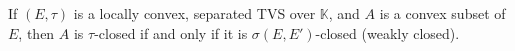 If $(E, \tau)$ is a locally convex, separated TVS over $\mathbb{K}$, and $A$ is a convex subset of $E$, then $A$ is $\tau$-closed if and only if it is $\sigma(E, E')$-closed (weakly closed).
